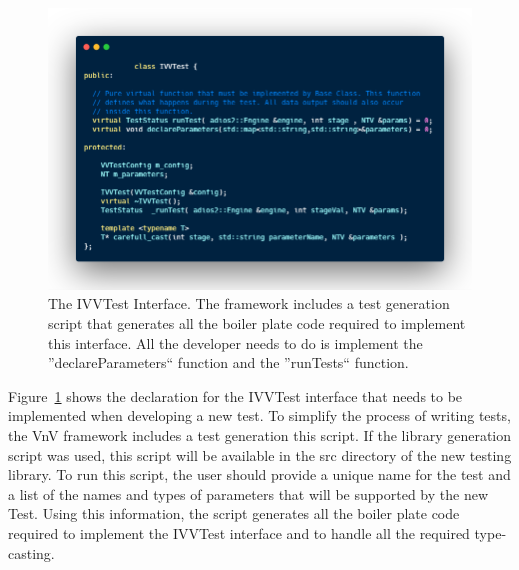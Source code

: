 \begin{figure}
 \includegraphics[width=\textwidth]{./Figures/test-interface.png}
 \caption{The IVVTest Interface. The framework includes a test generation script that generates all the boiler plate code required to implement this interface. All the developer
 needs to do is implement the ''declareParameters`` function and the ''runTests`` function. \label{test-inter}} 
\end{figure}



Figure~\ref{test-inter} shows the declaration for the IVVTest interface that needs to be implemented when developing a new test. To simplify the process of writing tests, the VnV framework includes a test generation this script. If the library generation script was used, this script will be available in the src directory of the new testing library. To run this script, the user should provide a unique name for the test and a list of the names and types of parameters that will be supported by the new Test. Using this information, the script generates all the boiler plate code required to implement the IVVTest interface and to handle all the required type-casting. 


